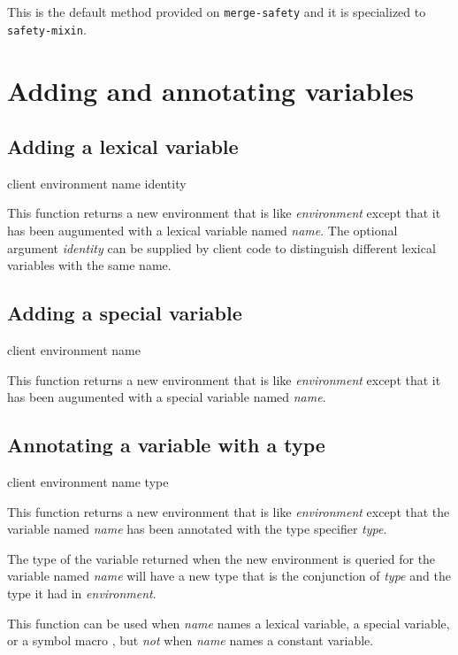 This is the default method provided on \texttt{merge-safety} and it is
specialized to \texttt{safety-mixin}.

\section{Adding and annotating variables}

\subsection{Adding a lexical variable}

{\footnotesize
{} {client environment name \optional identity}
}

This function returns a new environment that is like
\textit{environment} except that it has been augumented with a lexical
variable named \textit{name}.  The optional argument \textit{identity}
can be supplied by client code to distinguish different lexical
variables with the same name.

\subsection{Adding a special variable}

{\footnotesize
{} {client environment name}
}

This function returns a new environment that is like
\textit{environment} except that it has been augumented with a special
variable named \textit{name}.

\subsection{Annotating a variable with a type}
\label{sec-annotating-a-variable-with-a-type}

{\footnotesize
{} {client environment name type}
}

This function returns a new environment that is like
\textit{environment} except that the variable named \textit{name} has
been annotated with the type specifier \textit{type}.

The type of the variable returned when the new environment is queried
for the variable named \textit{name} will have a new type that is the
conjunction of \textit{type} and the type it had in
\textit{environment}.

This function can be used when \textit{name} names a lexical variable,
a special variable, or a symbol macro
, but \emph{not}
when \textit{name} names a constant variable.

